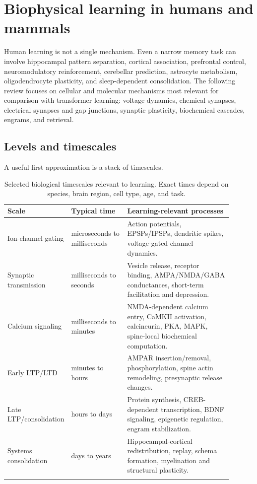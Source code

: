 \documentclass[11pt]{article}
\newcommand{\1}{\mathbf{1}}
\begin{document}
\section{Biophysical learning in humans and mammals}

Human learning is not a single mechanism. Even a narrow memory task can involve hippocampal pattern separation, cortical association, prefrontal control, neuromodulatory reinforcement, cerebellar prediction, astrocyte metabolism, oligodendrocyte plasticity, and sleep-dependent consolidation. The following review focuses on cellular and molecular mechanisms most relevant for comparison with transformer learning: voltage dynamics, chemical synapses, electrical synapses and gap junctions, synaptic plasticity, biochemical cascades, engrams, and retrieval.

\subsection{Levels and timescales}

A useful first approximation is a stack of timescales.

\begin{longtable}{p{0.18\linewidth}p{0.25\linewidth}p{0.47\linewidth}}
\toprule
Scale & Typical time & Learning-relevant processes \\
\midrule
Ion-channel gating & microseconds to milliseconds & Action potentials, EPSPs/IPSPs, dendritic spikes, voltage-gated channel dynamics. \\
Synaptic transmission & milliseconds to seconds & Vesicle release, receptor binding, AMPA/NMDA/GABA conductances, short-term facilitation and depression. \\
Calcium signaling & milliseconds to minutes & NMDA-dependent calcium entry, CaMKII activation, calcineurin, PKA, MAPK, spine-local biochemical computation. \\
Early LTP/LTD & minutes to hours & AMPAR insertion/removal, phosphorylation, spine actin remodeling, presynaptic release changes. \\
Late LTP/consolidation & hours to days & Protein synthesis, CREB-dependent transcription, BDNF signaling, epigenetic regulation, engram stabilization. \\
Systems consolidation & days to years & Hippocampal-cortical redistribution, replay, schema formation, myelination and structural plasticity. \\
\bottomrule
\caption{Selected biological timescales relevant to learning. Exact times depend on species, brain region, cell type, age, and task.}
\end{longtable}
\end{document}
